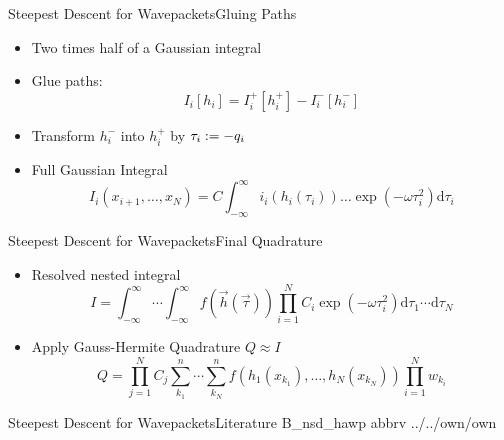 \documentclass{beamer}
\begin{document}
\begin{frame}{Steepest Descent for Wavepackets}{Gluing Paths}
  \begin{itemize}
    \item Two times half of a Gaussian integral
    \item Glue paths:
    \begin{equation*}
      I_i[h_i] =
      I_i^{+}[h_i^{+}]
      -
      I_i^{-}[h_i^{-}]
    \end{equation*}
    \item Transform $h_i^{-}$ into $h_i^{+}$ by $\tau_i := -q_i$
    \item Full Gaussian Integral
    \begin{equation*}
      I_i\left(x_{i+1},\ldots,x_N\right) =
      C
      \int_{-\infty}^\infty
        i_i\left(h_i\left(\tau_i\right)\right)
        \ldots
        \exp\left(- \omega \tau_i^2\right)
      \mathrm{d}\tau_i
    \end{equation*}
  \end{itemize}
\end{frame}


\begin{frame}{Steepest Descent for Wavepackets}{Final Quadrature}
  \begin{itemize}
    \item Resolved nested integral
    \begin{equation*}
      I = \int_{-\infty}^\infty \cdots \int_{-\infty}^\infty
          f\left(\vec{h}(\vec{\tau})\right)
          \prod_{i=1}^N C_i
                        \exp\left(-\omega \tau_i^2\right)
          \mathrm{d}\tau_1 \cdots \mathrm{d}\tau_N
    \end{equation*}
    \item Apply Gauss-Hermite Quadrature $Q \approx I$
    \begin{equation*}
      Q =
      \prod_{j=1}^N
      C_j
      \sum_{k_1}^n \cdots \sum_{k_N}^n
      f\left(h_1\left(x_{k_1}\right),
           \ldots,
           h_N\left(x_{k_N}\right)
    \right)
    \prod_{i=1}^N w_{k_i}
    \end{equation*}
  \end{itemize}
\end{frame}


\begin{frame}{Steepest Descent for Wavepackets}{Literature}
  \nocite{sdwp}{B_nsd_hawp}
  \scriptsize
  {abbrv}
  {../../own/own}{}
\end{frame}
\end{document}

